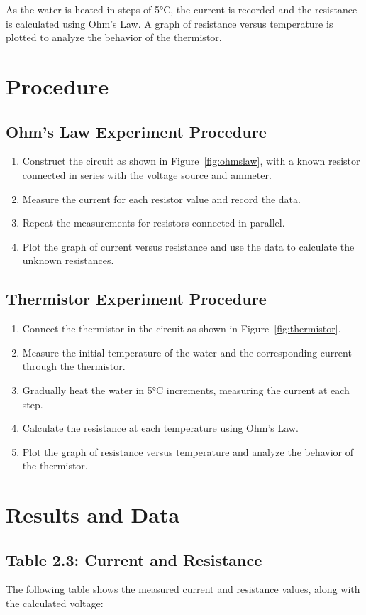 \documentclass[journal]{IEEEtran}
\begin{document}
As the water is heated in steps of 5°C, the current is recorded and the resistance is calculated using Ohm’s Law. A graph of resistance versus temperature is plotted to analyze the behavior of the thermistor.

\section{Procedure}
\subsection{Ohm’s Law Experiment Procedure}
\begin{enumerate}
    \item Construct the circuit as shown in Figure~\ref{fig:ohmslaw}, with a known resistor connected in series with the voltage source and ammeter.
    \item Measure the current for each resistor value and record the data.
    \item Repeat the measurements for resistors connected in parallel.
    \item Plot the graph of current versus resistance and use the data to calculate the unknown resistances.
\end{enumerate}

\subsection{Thermistor Experiment Procedure}
\begin{enumerate}
    \item Connect the thermistor in the circuit as shown in Figure~\ref{fig:thermistor}.
    \item Measure the initial temperature of the water and the corresponding current through the thermistor.
    \item Gradually heat the water in 5°C increments, measuring the current at each step.
    \item Calculate the resistance at each temperature using Ohm’s Law.
    \item Plot the graph of resistance versus temperature and analyze the behavior of the thermistor.
\end{enumerate}
\section{Results and Data}

\subsection{Table 2.3: Current and Resistance}
The following table shows the measured current and resistance values, along with the calculated voltage:
\end{document}
